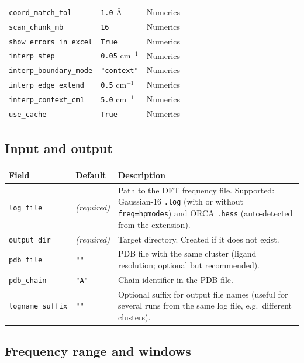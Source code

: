 \documentclass[11pt,a4paper,twoside]{article}
\theoremstyle{remark}
\begin{document}
\begin{longtable}{p{} p{} p{}}
\texttt{coord\_match\_tol}          & \texttt{1.0} \AA     & Numerics \\
\texttt{scan\_chunk\_mb}            & \texttt{16}          & Numerics \\
\texttt{show\_errors\_in\_excel}    & \texttt{True}        & Numerics \\
\texttt{interp\_step}               & \texttt{0.05} cm$^{-1}$ & Numerics \\
\texttt{interp\_boundary\_mode}     & \texttt{"context"}   & Numerics \\
\texttt{interp\_edge\_extend}       & \texttt{0.5} cm$^{-1}$ & Numerics \\
\texttt{interp\_context\_cm1}       & \texttt{5.0} cm$^{-1}$ & Numerics \\
\texttt{use\_cache}                 & \texttt{True}        & Numerics \\
\bottomrule
\end{longtable}



\subsection{Input and output}

\begin{longtable}{p{} p{} p{}}
\toprule
\textbf{Field} & \textbf{Default} & \textbf{Description} \\
\midrule
\endhead
\texttt{log\_file}      & \emph{(required)} & Path to the DFT
  frequency file. Supported: Gaussian-16 \texttt{.log} (with or
  without \texttt{freq=hpmodes}) and ORCA \texttt{.hess} (auto-detected
  from the extension). \\
\texttt{output\_dir}    & \emph{(required)} & Target directory.
  Created if it does not exist. \\
\texttt{pdb\_file}      & \texttt{""}     & PDB file with the same
  cluster (ligand resolution; optional but recommended). \\
\texttt{pdb\_chain}     & \texttt{"A"}     & Chain identifier in
  the PDB file. \\
\texttt{logname\_suffix} & \texttt{""}     & Optional suffix for
  output file names (useful for several runs from the same log
  file, e.g.\ different clusters). \\
\bottomrule
\end{longtable}

\subsection{Frequency range and windows}
\end{document}
